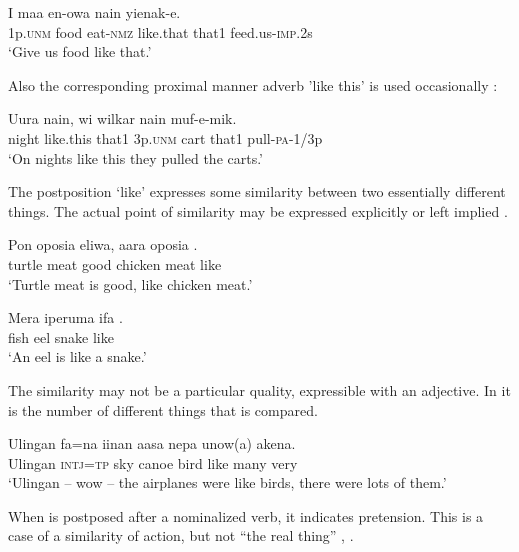 \ea%
\label{ex:6:x1348}
\gll I  maa  en-owa    nain  yienak-e. \\
1p.\textsc{unm}  food  eat-\textsc{nmz}  like.that  that1  feed.us-\textsc{imp}.2s\\
\glt `Give us food like that.'
\z

Also the corresponding proximal manner adverb  'like this' is used occasionally :

\ea%
\label{ex:6:x1347}
\gll Uura    nain,  wi  wilkar  nain  muf-e-mik. \\
night  like.this  that1  3p.\textsc{unm}  cart  that1  pull-\textsc{pa}-1/3p\\
\glt `On nights like this they pulled the carts.'
\z

The postposition  `like' expresses some similarity between two essentially different things. The actual point of similarity may be expressed explicitly  or left implied .

\ea%
\label{ex:6:x1341}
\gll Pon  oposia  eliwa,  aara  oposia  . \\
turtle  meat  good  chicken  meat  like\\
\glt `Turtle meat is good, like chicken meat.'
\z

\ea%
\label{ex:6:x1340}
\gll Mera  iperuma  ifa  . \\
fish  eel  snake  like\\
\glt `An eel is like a snake.'
\z

The similarity may not be a particular quality, expressible with an adjective. In  it is the number of different things that is compared.

\ea%
\label{ex:6:x1342}
\gll Ulingan  fa=na  iinan  aasa  nepa    unow(a)  akena. \\
Ulingan  \textsc{intj}=\textsc{tp}  sky  canoe  bird  like  many  very\\
\glt `Ulingan -- wow -- the airplanes were like birds, there were lots of them.'
\z

When  is postposed after a nominalized verb, it indicates pretension. This is a case of a similarity of action, but not ``the real thing'' , .


